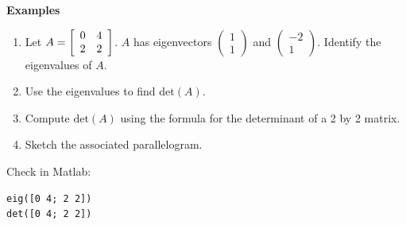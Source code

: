 \documentclass[12pt,letterpaper,noanswers]{exam}
\begin{document}
\noindent\textbf{Examples}
\begin{enumerate}
    \item 
Let $A = \left[\begin{array}{c c}0 & 4 \\ 2 & 2 \end{array}\right]$. $A$ has eigenvectors $\left(\begin{array}{c} 1 \\ 1\end{array}\right)$ and $\left(\begin{array}{c} -2 \\ 1\end{array}\right)$. Identify the eigenvalues of $A$.
\vspace{1.2in}

\item Use the eigenvalues to find $\text{det}(A)$.
\vspace{0.2in}

\item Compute $\text{det}(A)$ using the formula for the determinant of a 2 by 2 matrix.
\vspace{0.2in}

\item Sketch the associated parallelogram.
\vspace{1in}

\end{enumerate}

Check in Matlab:
\begin{lstlisting}
eig([0 4; 2 2])
det([0 4; 2 2])
\end{lstlisting}
\end{document}
